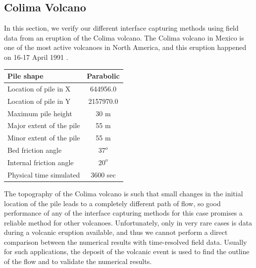 \documentclass[letterpaper,10pt]{article}
\begin{document}
\subsection{Colima Volcano}
In this section, we verify our different interface capturing methods using field data from an eruption of the Colima volcano. 
The Colima volcano in Mexico is one of the most active volcanoes in North America, and this eruption happened on 16-17 April 1991 \cite{Charbonnier2008}. 
\begin{center}
        \begin{tabular}{|l|c|}
                \hline
                Pile shape       & Parabolic \\
                \hline
                Location of pile in X     & 644956.0 \\
                \hline
                Location of pile in Y     & 2157970.0 \\
                \hline
                Maximum pile height       & 30 m \\
                \hline
                Major extent of the pile  & 55 m \\
                \hline
                Minor extent of the pile  & 55 m \\
                \hline           
                Bed friction angle        & $37^o$ \\
                \hline
                Internal friction angle  & $20^o$ \\
                \hline
                Physical time simulated  & 3600 sec \\
                \hline
        \end{tabular}
\end{center}
The topography of the Colima volcano is such that small changes in the initial location of the pile leads to a completely different 
path of flow, so good performance of any of the interface capturing methods for this case promises a reliable method for other volcanoes. 
Unfortunately, only in very rare cases is data during a volcanic eruption available, and thus we cannot perform a direct comparison between the numerical results 
with time-resolved field data.
Usually for such applications, the deposit of the volcanic event is used to find the outline of the flow and to validate the numerical results.
\end{document}
